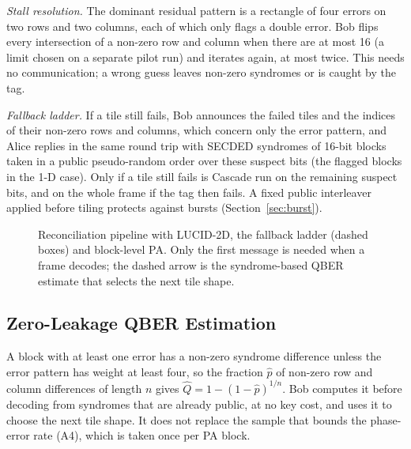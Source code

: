 \documentclass[conference]{IEEEtran}
\begin{document}
\textit{Stall resolution.} The dominant residual pattern is a rectangle of four errors on two rows and two columns, each of which only flags a double error. Bob flips every intersection of a non-zero row and column when there are at most 16 (a limit chosen on a separate pilot run) and iterates again, at most twice. This needs no communication; a wrong guess leaves non-zero syndromes or is caught by the tag.

\textit{Fallback ladder.} If a tile still fails, Bob announces the failed tiles and the indices of their non-zero rows and columns, which concern only the error pattern, and Alice replies in the same round trip with SECDED syndromes of 16-bit blocks taken in a public pseudo-random order over these suspect bits (the flagged blocks in the 1-D case). Only if a tile still fails is Cascade run on the remaining suspect bits, and on the whole frame if the tag then fails. A fixed public interleaver applied before tiling protects against bursts (Section~\ref{sec:burst}).

\begin{figure}[t]
\centering
\caption{Reconciliation pipeline with LUCID-2D, the fallback ladder (dashed boxes) and block-level PA. Only the first message is needed when a frame decodes; the dashed arrow is the syndrome-based QBER estimate that selects the next tile shape.}
\label{fig:pipeline}
\end{figure}

\subsection{Zero-Leakage QBER Estimation}
A block with at least one error has a non-zero syndrome difference unless the error pattern has weight at least four, so the fraction $\hat p$ of non-zero row and column differences of length $n$ gives $\hat Q=1-(1-\hat p)^{1/n}$. Bob computes it before decoding from syndromes that are already public, at no key cost, and uses it to choose the next tile shape. It does not replace the sample that bounds the phase-error rate (A4), which is taken once per PA block.
\end{document}
